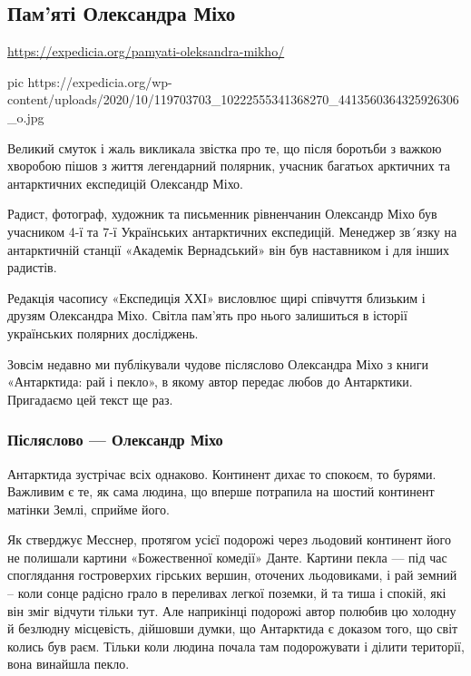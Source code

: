  
 

\subsection{Пам’яті Олександра Міхо}
\label{sec:16_10_2020.sites.expedicia_org.miho}

\url{https://expedicia.org/pamyati-oleksandra-mikho/}

\ifcmt
pic https://expedicia.org/wp-content/uploads/2020/10/119703703_10222555341368270_4413560364325926306_o.jpg
\fi

Великий смуток і жаль викликала звістка про те, що після боротьби з важкою
хворобою пішов з життя легендарний полярник, учасник багатьох арктичних та
антарктичних експедицій Олександр Міхо.

Радист, фотограф, художник та письменник рівненчанин Олександр Міхо був
учасником 4-ї та 7-ї Українських антарктичних експедицій. Менеджер зв´язку на
антарктичній станції «Академік Вернадський» він був наставником і для інших
радистів.

Редакція часопису «Експедиція ХХІ» висловлює щирі співчуття близьким і друзям
Олександра Міхо. Світла пам’ять про нього залишиться в історії українських
полярних досліджень.

Зовсім недавно ми публікували чудове післяслово Олександра Міхо з книги
«Антарктида: рай і пекло», в якому автор передає любов до Антарктики.
Пригадаємо цей текст ще раз.

\subsubsection{Післяслово --- Олександр Міхо}

Антарктида зустрічає всіх однаково. Континент дихає то спокоєм, то бурями.
Важливим є те, як сама людина, що вперше потрапила на шостий континент матінки
Землі, сприйме його. 

Як стверджує Месснер, протягом усієї подорожі через льодовий континент його не
полишали картини «Божественної комедії» Данте. Картини пекла --- під час
споглядання гостроверхих гірських вершин, оточених льодовиками, і рай земний –
коли сонце радісно грало в переливах легкої поземки, й та тиша і спокій, які
він зміг відчути тільки тут. Але наприкінці подорожі автор полюбив цю холодну й
безлюдну місцевість, дійшовши думки, що Антарктида є доказом того, що світ
колись був раєм. Тільки коли людина почала там подорожувати і ділити території,
вона винайшла пекло. 

